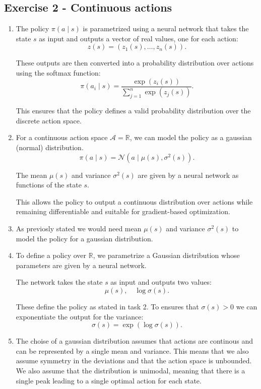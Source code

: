 \documentclass{article}
\begin{document}
\subsection*{Exercise 2 - Continuous actions}
\begin{enumerate}
    \item  
    The policy $\pi(a \mid s)$ is parametrized using a neural network that takes the state $s$ as input and outputs a vector of real values, one for each action:
\[
z(s) = (z_1(s), \dots, z_n(s)).
\]

These outputs are then converted into a probability distribution over actions using the softmax function:
\[
\pi(a_i \mid s) = \frac{\exp(z_i(s))}{\sum_{j=1}^n \exp(z_j(s))}.
\]

This ensures that the policy defines a valid probability distribution over the discrete action space.
    
\item For a continuous action space $\mathcal{A} = \mathbb{R}$, we can model the policy as a gaussian (normal) distribution.
\[
\pi(a \mid s) = \mathcal{N}(a \mid \mu(s), \sigma^2(s)).
\]

The mean $\mu(s)$ and variance $\sigma^2(s)$ are given by a neural network as functions of the state $s$.

This allows the policy to output a continuous distribution over actions while remaining differentiable and suitable for gradient-based optimization.

\item As previosly stated we would need mean $\mu(s)$ and variance $\sigma^2(s)$ to model the policy for a gaussian distribution.
\item To define a policy over $\mathbb{R}$, we parametrize a Gaussian distribution whose parameters are given by a neural network.

The network takes the state $s$ as input and outputs two values:
\[
\mu(s), \quad \log \sigma(s).
\]

These define the policy as stated in task 2.
To ensures that $\sigma(s) > 0$ we can exponentiate the output for the variance:
\[
\sigma(s) = \exp(\log \sigma(s)).
\]

\item The choise of a gaussian distribution assumes that actions are continous and can be represented by a single mean and variance.
This means that we also assume symmetry in the deviations and that the action space is unbounded. We also assume that the distribution is unimodal, meaning that there is a single peak leading to a single optimal action for each state.
\end{enumerate}
\end{document}

